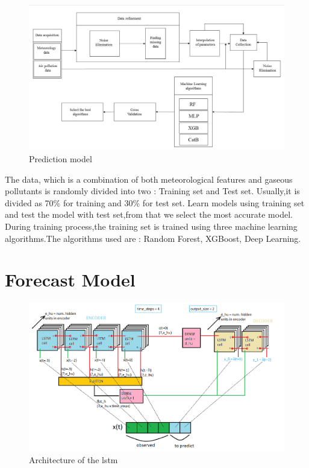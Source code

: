 \begin{figure}[h!]
\label{bb}
\centering
\includegraphics[width= 14 cm]{prearch.jpg}
\caption{Prediction model }
\end{figure}
\pagebreak
The data, which is a combination of both meteorological features and gaseous pollutants is randomly divided into two : Training set and Test set. Usually,it is divided as 70\% for training and 30\% for  test set. Learn models using training set and test the model with test set,from that we select the most accurate model. During training process,the training set is trained using three machine learning algorithms.The algorithms used are : Random Forest, XGBoost, Deep Learning.



\section {Forecast Model}

\begin{figure}[h!]
\label{bc}
\centering
\includegraphics[width= 14 cm]{lstm.png}
\caption{Architecture of the lstm}
\end{figure}



